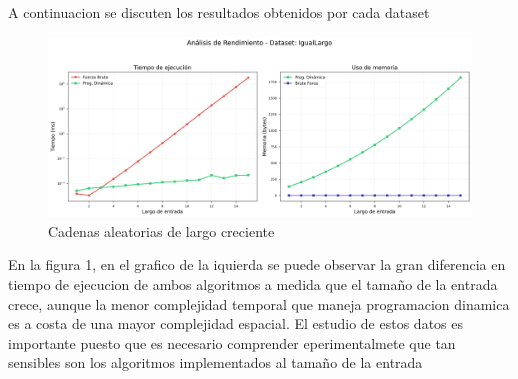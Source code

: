
A continuacion se discuten los resultados obtenidos por cada dataset
\begin{figure}[H]
    \centering
        \includegraphics[width=\textwidth]{images/IgualLargo_analisis.png}
    \caption{Cadenas aleatorias de largo creciente}
    \label{fig:scatterplot_1}
\end{figure}
En la figura 1, en el grafico de la iquierda se puede observar la gran diferencia en tiempo de ejecucion de ambos algoritmos a medida que el tamaño
de la entrada crece, aunque la menor complejidad temporal que maneja programacion dinamica es a costa de una mayor complejidad espacial.
El estudio de estos datos es importante puesto que es necesario comprender eperimentalmete que tan sensibles son los algoritmos implementados al tamaño de la entrada

